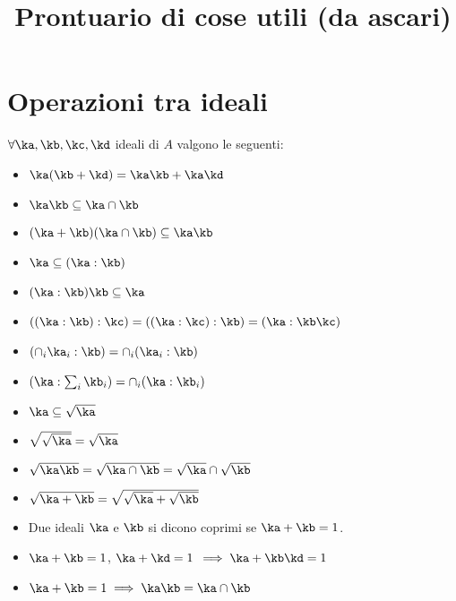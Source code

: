 \documentclass[a4paper,NoNotes,GeneralMath]{stdmdoc}
\begin{document}
	\clearpage
	\title {Prontuario di cose utili (da ascari)}
	\section*{Operazioni tra ideali}
	$\forall \ka, \kb, \kc, \kd$ ideali di $A$ valgono le seguenti:
	\begin{itemize}
		\item $\ka (\kb + \kd) = \ka \kb + \ka \kd$
		\item $\ka \kb \subseteq \ka \cap \kb$
		\item $(\ka + \kb)(\ka \cap \kb) \subseteq \ka \kb$
		\item $\ka \subseteq (\ka : \kb)$
		\item $(\ka : \kb)\kb \subseteq \ka$
		\item $((\ka : \kb) : \kc) = ((\ka : \kc) : \kb) = (\ka : \kb\kc)$
		\item $(\cap_i \ka_i : \kb) = \cap_i (\ka_i : \kb)$
		\item $(\ka : \sum_i \kb_i) = \cap_i (\ka : \kb_i)$
		\item $\ka \subseteq \sqrt{\ka}$
		\item $\sqrt{\sqrt{\ka}} = \sqrt{\ka}$
		\item $\sqrt{\ka \kb} = \sqrt{\ka \cap \kb} = \sqrt{\ka} \cap \sqrt{\kb}$
		\item $\sqrt{\ka + \kb} = \sqrt{\sqrt{\ka} + \sqrt{\kb}}$
		\item Due ideali $\ka$ e $\kb$ si dicono coprimi se $\ka + \kb = 1$.
		\item $\ka + \kb = 1$, $\ka + \kd = 1$ $\implies \ka + \kb\kd = 1$
		\item $\ka + \kb = 1 \implies \ka\kb = \ka \cap \kb$
	\end{itemize}
	
\end{document}
